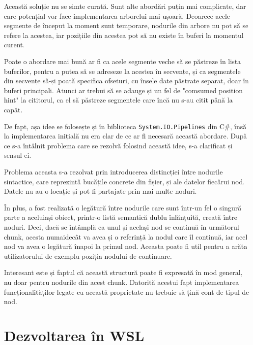 \documentclass[a4paper,12pt]{report}
\begin{document}
Această soluție nu se simte curată.
Sunt alte abordări puțin mai complicate, dar care potențial vor face implementarea arborelui mai ușoară.
Deoarece acele segmente de început la moment sunt temporare,
nodurile din arbore nu pot să se refere la acestea, iar pozițiile din acestea pot să nu existe în buferi la momentul curent.

Poate o abordare mai bună ar fi ca acele segmente veche să se păstreze în lista buferilor,
pentru a putea să se adreseze la acestea în secvențe,
și ca segmentele din secvențe să-și poată specifica ofseturi,
cu însele date păstrate separat, doar în buferi principali.
Atunci ar trebui să se adauge și un fel de "comsumed position hint" la cititorul,
ca el să păstreze segmentele care încă nu s-au citit până la capăt.

De fapt, așa idee se folosește și în biblioteca \texttt{System.IO.Pipelines} din C\#,
însă la implementarea inițială nu era clar de ce ar fi necesară această abordare.
După ce s-a întâlnit problema care se rezolvă folosind această idee, s-a clarificat și sensul ei.

Problema aceasta s-a rezolvat prin introducerea distincției între nodurile sintactice,
care reprezintă bucățile concrete din fișier, și ale datelor fiecărui nod.
Datele nu au o locație și pot fi partajate prin mai multe noduri.

În plus, a fost realizată o legătură între nodurile care sunt într-un fel o singură parte a aceluiași obiect,
printr-o listă semantică dublu înlănțuită, creată între noduri.
Deci, dacă se întâmplă ca unul și același nod se continuă în următorul chunk,
acesta numaidecât va avea și o referință la nodul care îl continuă,
iar acel nod va avea o legătură înapoi la primul nod.
Aceasta poate fi util pentru a arăta utilizatorului de exemplu poziția nodului de continuare.

Interesant este și faptul că această structură poate fi expresată în mod general,
nu doar pentru nodurile din acest chunk.
Datorită acestui fapt implementarea funcționalităților legate cu această proprietate
nu trebuie să țină cont de tipul de nod.


\section{Dezvoltarea în \ac{WSL}}
\end{document}
